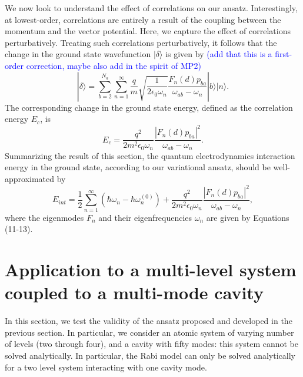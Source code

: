 \documentclass[aps,prb,twocolumn,
	groupedaddress,superscriptaddress,
	amsfonts,amssymb,amsmath,floatfix,
	citeautoscript]{revtex4-1}
\newcommand{\Jadd}[1]{\textcolor{blue}{#1}}
\begin{document}
We now look to understand the effect of correlations on our ansatz. Interestingly, at lowest-order, correlations are entirely a result of the coupling between the momentum and the vector potential. Here, we capture the effect of correlations perturbatively. Treating such correlations perturbatively, it follows that the change in the ground state wavefunction $|\delta\rangle$ is given by \Jadd{(add that this is a first-order correction, maybe also add in the spirit of MP2)}
\begin{equation}
|\delta\rangle = \sum\limits_{b = 2}^{N_a}\sum\limits_{n=1}^{\infty} \frac{q}{m}\sqrt{\frac{1}{2\epsilon_0\omega_n}}\frac{F_n(d)p_{ba}}{\omega_{ab}-\omega_n}|b\rangle|n\rangle.
\end{equation}
The corresponding change in the ground state energy, defined as the correlation energy $E_c$, is
\begin{equation}
E_{c} = \frac{q^2}{2m^2\epsilon_0\omega_n}\frac{|F_n(d)p_{ba}|^2}{\omega_{ab}-\omega_n}.
\end{equation}
Summarizing the result of this section, the quantum electrodynamics interaction energy in the ground state, according to our variational ansatz, should be well-approximated by
\begin{equation}
E_{int} = \frac{1}{2}\sum\limits_{n=1}^{\infty}\left(\hbar\omega_n - \hbar\omega_n^{(0)} \right) + \frac{q^2}{2m^2\epsilon_0\omega_n}\frac{|F_n(d)p_{ba}|^2}{\omega_{ab}-\omega_n},
\end{equation}
where the eigenmodes $F_n$ and their eigenfrequencies $\omega_n$ are given by Equations (11-13).

\section{Application to a multi-level system coupled to a multi-mode cavity}
\label{sec:multi-level}

In this section, we test the validity of the ansatz proposed and developed in the previous section. In particular, we consider an atomic system of varying number of levels (two through four), and a cavity with fifty modes: this system cannot be solved analytically. In particular, the Rabi model can only be solved analytically for a two level system interacting with one cavity mode. 
\end{document}
